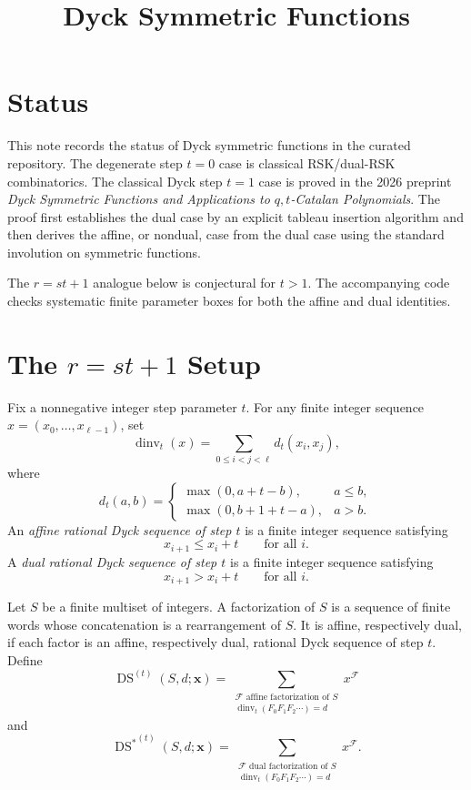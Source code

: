 \documentclass{article}
\title{Dyck Symmetric Functions}
\author{}
\date{}
\newcommand{\dinv}{\operatorname{dinv}}
\newcommand{\DS}{\operatorname{DS}}
\newcommand{\DSstar}{\operatorname{DS}^{\ast}}
\begin{document}
\maketitle

\section{Status}

This note records the status of Dyck symmetric functions in the curated
repository.  The degenerate step \(t=0\) case is classical RSK/dual-RSK
combinatorics.  The classical Dyck step \(t=1\) case is proved in the 2026
preprint
\emph{Dyck Symmetric Functions and Applications to \(q,t\)-Catalan
Polynomials}.  The proof first establishes the dual case by an explicit
tableau insertion algorithm and then derives the affine, or nondual, case
from the dual case using the standard involution on symmetric functions.

The \(r=s t+1\) analogue below is conjectural for \(t>1\).  The accompanying
code checks systematic finite parameter boxes for both the affine and dual
identities.

\section{The \(r=s t+1\) Setup}

Fix a nonnegative integer step parameter \(t\).  For any finite integer
sequence \(x=(x_0,\ldots,x_{\ell-1})\), set
\[
  \dinv_t(x)=
  \sum_{0\le i<j<\ell} d_t(x_i,x_j),
\]
where
\[
  d_t(a,b)=
  \begin{cases}
    \max(0,a+t-b),& a\le b,\\
    \max(0,b+1+t-a),& a>b.
  \end{cases}
\]
An \emph{affine rational Dyck sequence of step \(t\)} is a finite integer
sequence satisfying
\[
  x_{i+1}\le x_i+t
  \qquad\text{for all }i.
\]
A \emph{dual rational Dyck sequence of step \(t\)} is a finite integer
sequence satisfying
\[
  x_{i+1}>x_i+t
  \qquad\text{for all }i.
\]

Let \(S\) be a finite multiset of integers.  A factorization of \(S\) is a
sequence of finite words whose concatenation is a rearrangement of \(S\).  It
is affine, respectively dual, if each factor is an affine, respectively dual,
rational Dyck sequence of step \(t\).  Define
\[
  \DS^{(t)}(S,d;\mathbf x)
  =
  \sum_{\substack{\mathcal F\text{ affine factorization of }S\\
                  \dinv_t(F_0F_1F_2\cdots)=d}}
  x^{\mathcal F}
\]
and
\[
  {\DSstar}^{(t)}(S,d;\mathbf x)
  =
  \sum_{\substack{\mathcal F\text{ dual factorization of }S\\
                  \dinv_t(F_0F_1F_2\cdots)=d}}
  x^{\mathcal F}.
\]
\end{document}
